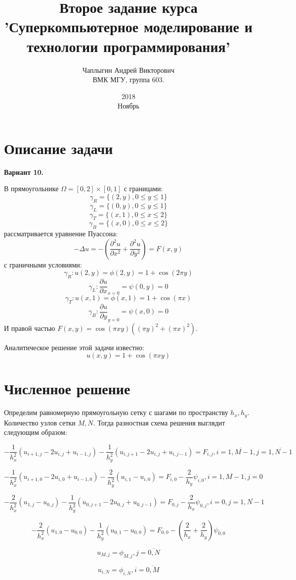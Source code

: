 \documentclass[12pt]{article}
\title{Второе задание курса 'Суперкомпьютерное моделирование и технологии программирования'}
\date{2018\\ Ноябрь}
\author{Чаплыгин Андрей Викторович\\  ВМК МГУ, группа 603.}
\def\d#1#2{\frac{\partial#1}{\partial#2}}
\def\dd#1#2{\frac{\partial^2 #1}{\partial#2^2}}
\begin{document}
\maketitle
\section{Описание задачи}
{\bf Вариант 10.} 

В прямоугольнике $\Omega = [0, 2] \times [0, 1]$ с границами:
$$ \gamma_R = \{(2, y), 0 \leq y \leq 1 \} $$
$$ \gamma_L = \{(0, y), 0 \leq y \leq 1 \} $$
$$ \gamma_T = \{(x, 1), 0 \leq x \leq 2 \} $$
$$ \gamma_B = \{(x, 0), 0 \leq x \leq 2 \} $$
рассматривается уравнение Пуассона:
$$ -\Delta u = -(\dd{u}{x} + \dd{u}{y}) = F(x, y) $$
с граничными условиями:
$$ \gamma_R: u(2, y) = \phi(2, y) = 1 + \cos(2 \pi y) $$
$$ \gamma_L: \d{u}{x}_{x=0} = \psi(0, y) = 0 $$
$$ \gamma_T: u(x, 1) = \phi(x, 1) = 1 + \cos(\pi x) $$
$$ \gamma_B: \d{u}{y}_{y=0} = \psi(x, 0) = 0 $$
И правой частью $F(x, y) = \cos(\pi x y) ((\pi y)^2 + (\pi x)^2)$.

Аналитическое решение этой задачи известно:
$$ u(x, y) = 1 + \cos(\pi x y) $$

\section{Численное решение}
Определим равномерную прямоугольную сетку с шагами по пространству $h_x, h_y$. 
Количество узлов сетки $M, N$. Тогда разностная схема решения выглядит следующим образом:

$$ -\frac{1}{h_x^2} (u_{i+1, j} - 2u_{i, j} + u_{i-1, j}) 
   -\frac{1}{h_y^2} (u_{i, j+1} - 2u_{i, j} + u_{i, j-1}) = F_{i, j}, 
   i = \overline{1, M-1}, j = \overline{1, N-1} $$

$$ -\frac{1}{h_x^2} (u_{i+1, 0} - 2u_{i, 0} + u_{i-1, 0}) 
   -\frac{2}{h_y^2} (u_{i, 1} - u_{i, 0}) = F_{i, 0} - \frac{2}{h_y} \psi_{i, 0}, 
   i = \overline{1, M-1}, j = 0 $$

$$ -\frac{2}{h_x^2} (u_{1, j} - u_{0, j}) 
   -\frac{1}{h_y^2} (u_{0, j+1} - 2u_{0, j} + u_{0, j-1}) = F_{0, j} - \frac{2}{h_x} \psi_{0, j}, 
   i = 0, j = \overline{1, N-1} $$   
  
$$ -\frac{2}{h_x^2} (u_{1, 0} - u_{0, 0}) 
   -\frac{1}{h_y^2} (u_{0, 1} - u_{0, 0}) = F_{0, 0} - (\frac{2}{h_x} + \frac{2}{h_y}) \psi_{0, 0} $$
   
$$ u_{M, j} = \phi_{M, j}, j = \overline{0, N} $$

$$ u_{i, N} = \phi_{i, N}, i = \overline{0, M} $$
\end{document}
